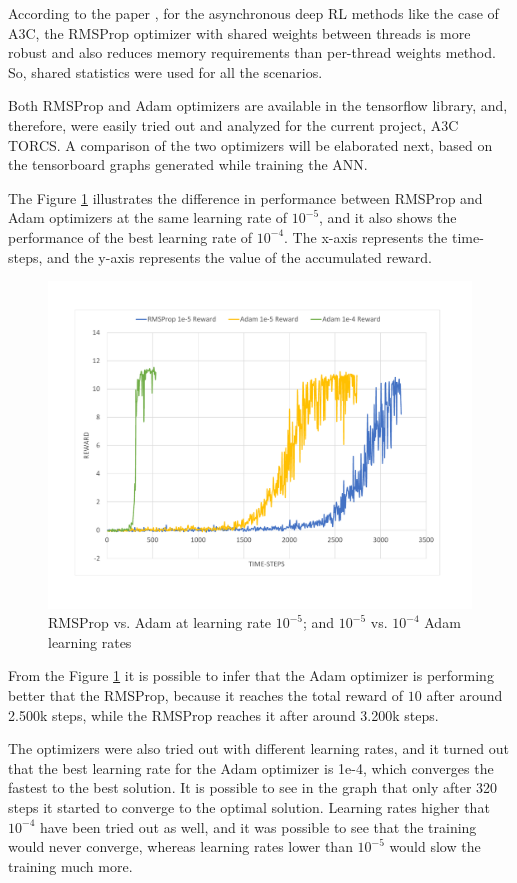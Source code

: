 According to the paper \cite{DBLP:journals/corr/MnihBMGLHSK16}, for the asynchronous deep RL methods like the case of A3C, the RMSProp optimizer with shared weights between threads is more robust and also reduces memory requirements than per-thread weights method. So, shared statistics were used for all the scenarios.

Both RMSProp and Adam optimizers are available in the tensorflow library, and, therefore, were easily tried out and analyzed for the current project, A3C TORCS. A comparison of the two optimizers will be elaborated next, based on the tensorboard graphs generated while training the ANN.

The Figure \ref{fig:OptimizersReward} illustrates the difference in performance between RMSProp and Adam optimizers at the same learning rate of $10^{-5}$, and it also shows the performance of the best learning rate of $10^{-4}$. The x-axis represents the time-steps, and the y-axis represents the value of the accumulated reward.
\begin{figure}[H]
	\centering
	\includegraphics[width=\textwidth]{Figures/OptimizersReward}
	\caption{RMSProp vs. Adam at learning rate $10^{-5}$; and $10^{-5}$ vs. $10^{-4}$ Adam learning rates}
	\label{fig:OptimizersReward}
\end{figure}
From the Figure \ref{fig:OptimizersReward} it is possible to infer that the Adam optimizer is performing better that the RMSProp, because it reaches the total reward of $10$ after around 2.500k steps, while the RMSProp reaches it after around 3.200k steps.

The optimizers were also tried out with different learning rates, and it turned out that the best learning rate for the Adam optimizer is 1e-4, which converges the fastest to the best solution. It is possible to see in the graph that only after 320 steps it started to converge to the optimal solution. Learning rates higher that $10^{-4}$ have been tried out as well, and it was possible to see that the training would never converge, whereas learning rates lower than $10^{-5}$ would slow the training much more.